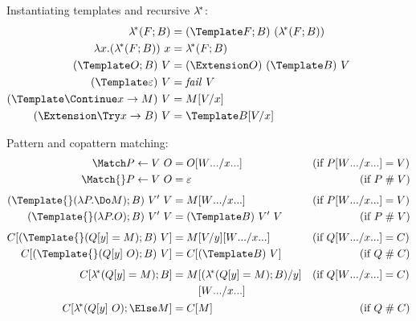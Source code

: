 \begin{figure}[t!]
Instantiating templates and recursive $\lambda^{\!*}$:
\begin{align*}
  \lamstar (F; B)
  &=
  (\Template F; B) ~ (\lamstar (F; B))
  \\
  \lambda x. (\lamstar (F; B)) ~ x
  &=
  \lamstar (F; B)
  \\
  (\Template O; B) ~ V
  &=
  (\Extension O) ~ (\Template B) ~ V
  \\
  (\Template \varepsilon) ~ V
  &=
  \mathit{fail}~V
  \\
  (\Template \Continue x \to M) ~ V
  &=
  M\subst{x}{V}
  \\
  (\Extension \Try x \to B) ~ V
  &=
  \Template B\subst{x}{V}
\end{align*}

Pattern and copattern matching:
\begin{align*}
  \Match P \gets V ~ O
  &=
  O\subst{\many{x}}{\many{W}}
  &(\text{if } P\subst{\many{x}}{\many{W}} &= V)
  \\
  \Match{} P \gets V ~ O
  &=
  \varepsilon
  &(\text{if } P &\apart V)
  \\[1ex]
  (\Template{} (\lambda P. \Do M); B) ~ V' ~ V
  &=
  M\subst{\many{x}}{\many{W}}
  &(\text{if } P\subst{\many{x}}{\many{W}} &= V)
  \\
  (\Template{} (\lambda P. O); B) ~ V' ~ V
  &=
  (\Template B) ~ V' ~ V
  &(\text{if } P &\apart V)
  \\[1ex]
  C[(\Template{} (Q[y] = M); B) ~ V]
  &=
  M\subst{y}{V}\subst{\many{x}}{\many{W}}
  &(\text{if } Q\subst{\many{x}}{\many{W}} &= C)
  \\
  C[(\Template{} (Q[y] ~ O); B) ~ V]
  &=
  C[(\Template B) ~ V]
  &(\text{if } Q &\apart C)
  \\[1ex]
  C[\lamstar (Q[y] = M); B]
  &=
  \begin{aligned}[t]
    M
    &\subst{y}{(\lamstar (Q[y] = M); B)}
    \\
    &\subst{\many{x}}{\many{W}}
  \end{aligned}
  &(\text{if } Q\subst{\many{x}}{\many{W}} &= C)
  \\
  C[\lamstar (Q[y] ~ O); \Else M]
  &=
  C[M]
  &(\text{if } Q &\apart C)
\end{align*}


\end{figure}
